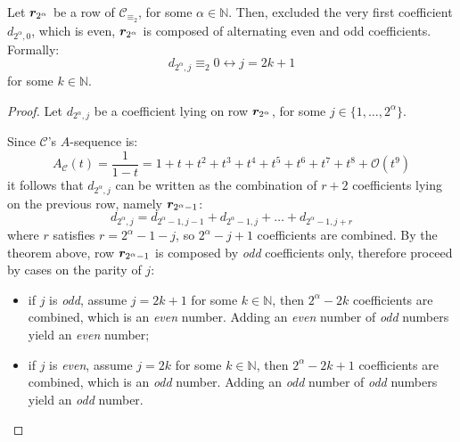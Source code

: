 \begin{theorem}
    Let $\boldsymbol{r}_{2^{\alpha}}$ be a row of $\mathcal{C}_{\equiv_{2}}$, 
    for some $\alpha\in\mathbb{N}$. Then, excluded the very first coefficient 
    $d_{2^{\alpha},0}$, which is even, $\boldsymbol{r}_{2^{\alpha}}$ is composed of
    alternating even and odd coefficients. Formally:
    \begin{displaymath}
        d_{2^{\alpha},j}\equiv_{2}0 \leftrightarrow j = 2k+1
    \end{displaymath}
    for some $k\in\mathbb{N}$.
\end{theorem}

\begin{proof}
    Let $d_{2^{\alpha},j}$ be a coefficient lying on row $\boldsymbol{r}_{2^{\alpha}}$,
    for some $j\in\lbrace1,\ldots,2^{\alpha}\rbrace$.

    Since $\mathcal{C}$'s $A$-sequence is:
    \begin{displaymath}
        A_{\mathcal{C}}(t)=\frac{1}{1-t}=1+t+t^{2}+t^{3}+t^{4}+t^{5}+t^{6}+t^{7}+t^{8}+
            \mathcal{O}(t^{9})
    \end{displaymath}
    it follows that $d_{2^{\alpha},j}$ can be written as the combination of $r+2$
    coefficients lying on the previous row, namely $\boldsymbol{r}_{2^{\alpha}-1}$:
    \begin{displaymath}
        d_{2^{\alpha},j} = d_{2^{\alpha}-1,j-1} +d_{2^{\alpha}-1,j} +\ldots+d_{2^{\alpha}-1,j+r} 
    \end{displaymath}
    where $r$ satisfies $r=2^{\alpha}-1-j$, so $2^{\alpha}-j+1$ coefficients are 
    combined.  By     the theorem above, row $\boldsymbol{r}_{2^{\alpha}-1}$ is composed by \emph{odd}
    coefficients only, therefore proceed by cases on the parity of $j$:
    \begin{itemize}
        \item if $j$ is \emph{odd}, assume $j=2k+1$ for some $k\in\mathbb{N}$, then
            $2^{\alpha}-2k$ coefficients are combined, which is an \emph{even} number. 
            Adding an \emph{even} number of \emph{odd} numbers yield an \emph{even} number;
        \item if $j$ is \emph{even}, assume $j=2k$ for some $k\in\mathbb{N}$, then
            $2^{\alpha}-2k+1$ coefficients are combined, which is an \emph{odd} number. 
            Adding an \emph{odd} number of \emph{odd} numbers yield an \emph{odd} number.
    \end{itemize}
\end{proof}

